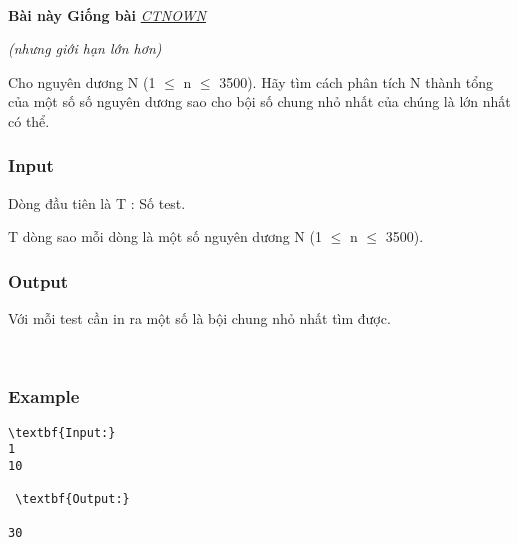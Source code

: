 

 

\textbf{Bài này Giống bài }\href{http://vnoi.info/problems/show/CTNOWN/}{\emph{ CTNOWN}}

\emph{(nhưng giới hạn lớn hơn) }

Cho nguyên dương N (1 $\le$ n $\le$ 3500). Hãy tìm cách phân tích N thành tổng của một số số nguyên dương sao cho bội số chung nhỏ nhất của chúng là lớn nhất có thể.

\subsubsection{Input}

Dòng đầu tiên là T : Số test.

T dòng sao mỗi dòng là một số nguyên dương N (1 $\le$ n  $\le$ 3500).

\subsubsection{Output}

Với mỗi test cần in ra một số là bội chung nhỏ nhất tìm được.

 

\subsubsection{Example}
\begin{verbatim}
\textbf{Input:}
1
10

 \textbf{Output:}

30
\end{verbatim}
